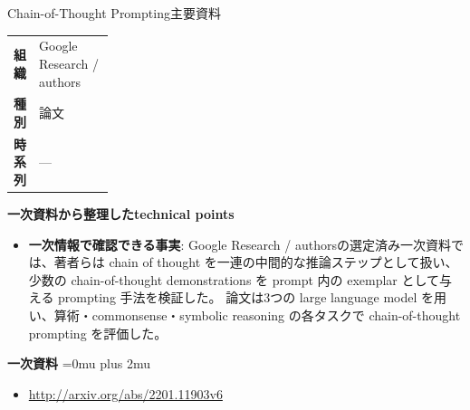 \begin{technicalnote}{Chain-of-Thought Prompting}{主要資料}
\begingroup
\begin{tabularx}{\linewidth}{@{}>{\bfseries}p{0.22\linewidth}X@{}}
組織 & Google Research / authors \\
種別 & 論文 \\
時系列 & — \\
\end{tabularx}
\smallskip
{\bfseries 一次資料から整理したtechnical points}
\begin{itemize}[leftmargin=1.5em,itemsep=0.35em]
\item \textbf{一次情報で確認できる事実}: Google Research / authorsの選定済み一次資料では、著者らは chain of thought を一連の中間的な推論ステップとして扱い、少数の chain-of-thought demonstrations を prompt 内の exemplar として与える prompting 手法を検証した。 論文は3つの large language model を用い、算術・commonsense・symbolic reasoning の各タスクで chain-of-thought prompting を評価した。
\end{itemize}
\begin{minipage}{\linewidth}
\begin{samepage}
{\bfseries 一次資料}
\begingroup\sloppy
\Urlmuskip=0mu plus 2mu\relax
\begin{itemize}[leftmargin=1.5em,itemsep=0.25em]
\item {\scriptsize\url{http://arxiv.org/abs/2201.11903v6}}
\end{itemize}
\endgroup
\end{samepage}
\end{minipage}
\endgroup
\end{technicalnote}
\medskip

